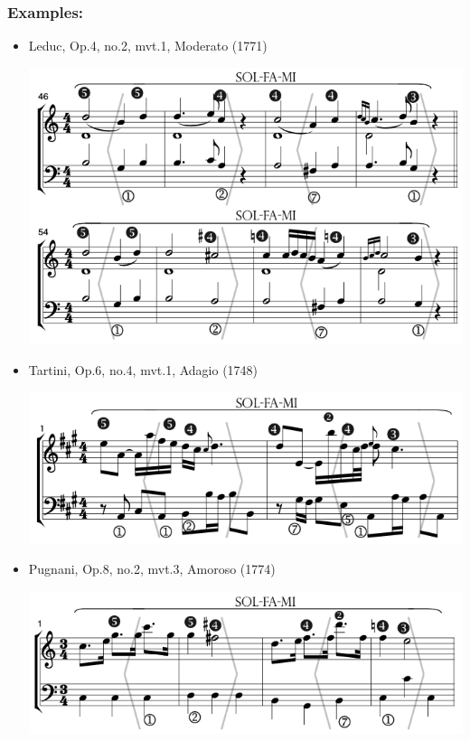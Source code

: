 ﻿\documentclass[11pt, openany]{article}
\begin{document}
\begin{itemize}
\subsubsection{Examples:}
\begin{itemize}
\item Leduc, Op.4, no.2, mvt.1, Moderato (1771)
\begin{center}
\includegraphics[scale=0.5]{leduc4.png}
\end{center}
\item Tartini, Op.6, no.4, mvt.1, Adagio (1748)
\begin{center}
\includegraphics[scale=0.5]{tartini6.png}
\end{center}
\item Pugnani, Op.8, no.2, mvt.3, Amoroso (1774)
\begin{center}
\includegraphics[scale=0.5]{pugnani8.png}
\end{center}
\end{itemize}



\end{itemize}
\end{document}
